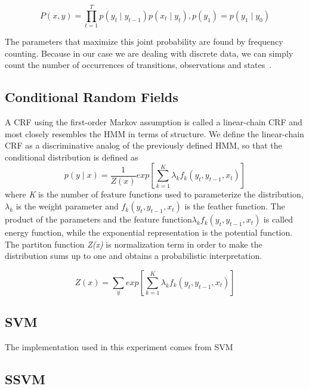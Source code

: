 \documentclass[11pt, oneside]{article}   	%
\begin{document}
\begin{equation}
P(x,y)=\prod_{t=1}^{T}p(y_{t}\mid y_{t-1})p(x_{t}\mid y_{t}), p(y_{1}) = p(y_{1}\mid y_{0})
\end{equation}

The parameters that maximize this joint probability are found by frequency counting. Because in our case we are dealing with discrete data, we can simply count the number of occurrences of transitions, observations and states~\cite{emtapia}.

\subsection{Conditional Random Fields}
A CRF using the first-order Markov assumption is called a linear-chain CRF and most closely resembles the HMM in terms of structure. We define the linear-chain CRF as a discriminative analog of the previously defined HMM, so that the conditional distribution is defined as
\begin{equation}
p(y\mid x)=\frac{1}{Z(x)}exp\left[{\sum_{k=1}^{K}}{\lambda}_{k}{f}_{k}({y}_{t},{y}_{t-1},{x}_{t})\right]
\end{equation}
where \textit{K} is the number of feature functions used to parameterize the distribution,${\lambda}_{k}$ is the weight parameter and ${f}_{k}({y}_{t},{y}_{t-1},{x}_{t})$ is the feather function. The product of the parameters and the feature function${\lambda}_{k}{f}_{k}({y}_{t},{y}_{t-1},{x}_{t})$ is called energy function, while the exponential representation is the potential function. The partiton function \textit{Z(x)} is normalization term in order to make the distribution sums up to one and obtains a probabilistic interpretation.

\begin{equation}
Z(x)=\sum_{y}^{}exp\left[{\sum_{k=1}^{K}}{\lambda}_{k}{f}_{k}({y}_{t},{y}_{t-1},{x}_{t})\right]
\end{equation}

\subsection{SVM}  The implementation used in this experiment comes from SVM

\subsection{SSVM}
\end{document}
